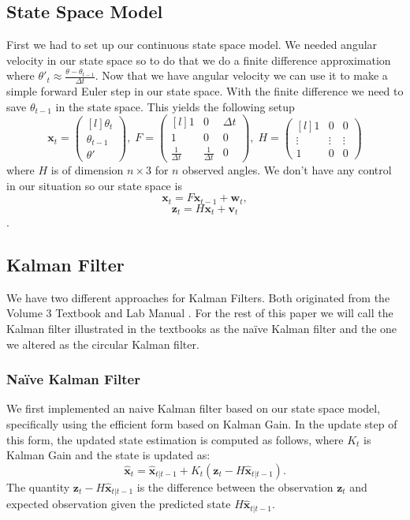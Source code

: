 \documentclass[11pt]{amsart}
\begin{document}
\subsection{State Space Model}
First we had to set up our continuous state space model. We needed angular velocity in our state space so to do that we do a finite difference approximation 
where $\theta'_t \approx \frac{\theta - \theta_{t-1}}{\Delta t}$. Now that we have angular velocity we can use it to make a simple forward Euler step in our state 
space. With the finite difference we need to save $\theta_{t-1}$ in the state space. This yields the following setup
\[\mathbf{x}_t = \begin{pmatrix*}[l]
    \theta_t \\
    \theta_{t-1} \\
    \theta'
\end{pmatrix*},\;  
F = \begin{pmatrix*}[l]
    1 & 0 & \Delta t \\
    1 & 0 & 0 \\
    \frac{1}{\Delta t} & \frac{1}{\Delta t} & 0
\end{pmatrix*},\;
H = \begin{pmatrix*}[l]
    1 & 0 & 0 \\
    \vdots & \vdots & \vdots\\
    1 & 0 & 0

\end{pmatrix*}\]
 where $H$ is of dimension $n\times3$ for $n$ observed angles. We don't have any control in our situation so our state space is
 \[\mathbf{x}_t = F\mathbf{x}_{t-1} + \mathbf{w}_t,\]
\[\mathbf{z}_t = H\mathbf{x}_t + \mathbf{v}_t\].

\subsection{Kalman Filter}
We have two different approaches for Kalman Filters. Both originated from the Volume 3 Textbook \cite{V3} and Lab Manual \cite{V3 Lab Manual}. For the rest of this paper we will call the Kalman filter 
illustrated in the textbooks as the naïve Kalman filter and the one we altered as the circular Kalman filter.

\subsubsection{Naïve Kalman Filter}
We first implemented an naive Kalman filter based on our state space model, specifically using the efficient form based on Kalman Gain. In the update step of this form, the updated state estimation is computed as follows, 
where $K_t$ is Kalman Gain and the state is updated as: \[\mathbf{\hat{x}}_t = \mathbf{\hat{x}}_{t|t-1} + K_t(\mathbf{z}_t - H\mathbf{\hat{x}}_{t|t-1}).\] The quantity $\mathbf{z}_t - H\mathbf{\hat{x}}_{t|t-1}$ is the difference between the observation $\mathbf{z}_t$ 
and expected observation given the predicted state $H\mathbf{\hat{x}}_{t|t-1}$.
\end{document}

